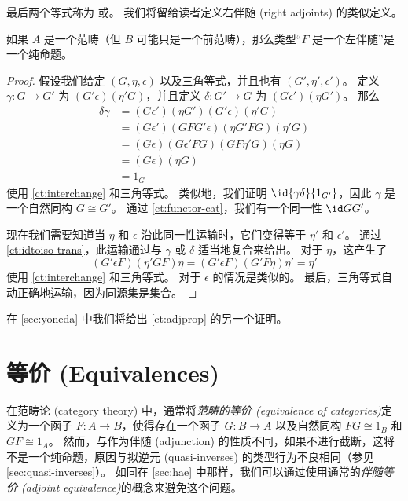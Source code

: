 最后两个等式称为 或。
我们将留给读者定义右伴随 (right adjoints) 的类似定义。

\begin{lem}\label{ct:adjprop}
如果 $A$ 是一个范畴（但 $B$ 可能只是一个前范畴），那么类型“$F$ 是一个左伴随”是一个纯命题。
\end{lem}
\begin{proof}
  假设我们给定 $(G,\eta,\epsilon)$ 以及三角等式，并且也有 $(G',\eta',\epsilon')$。
  定义 $\gamma:G\to G'$ 为 $(G'\epsilon)(\eta' G)$，并且定义 $\delta:G'\to G$ 为 $(G\epsilon')(\eta G')$。
  那么
  \begin{align*}
    \delta\gamma &=
    (G\epsilon')(\eta G')(G'\epsilon)(\eta'G)\\
    &= (G\epsilon')(G F G'\epsilon)(\eta G' F G)(\eta'G)\\
    &= (G\epsilon)(G\epsilon'FG)(G F \eta' G)(\eta G)\\
    &= (G\epsilon)(\eta G)\\
    &= 1_G
  \end{align*}
  使用 \cref{ct:interchange} 和三角等式。
  类似地，我们证明 $\id{\gamma\delta}{1_{G'}}$，因此 $\gamma$ 是一个自然同构 $G\cong G'$。
  通过 \cref{ct:functor-cat}，我们有一个同一性 $\id G {G'}$。

  现在我们需要知道当 $\eta$ 和 $\epsilon$ 沿此同一性运输时，它们变得等于 $\eta'$ 和 $\epsilon'$。
  通过 \cref{ct:idtoiso-trans}，此运输通过与 $\gamma$ 或 $\delta$ 适当地复合来给出。
  对于 $\eta$，这产生了
  \begin{equation*}
  (G'\epsilon F)(\eta'GF)\eta
  = (G'\epsilon F)(G'F\eta)\eta'
  = \eta'
  \end{equation*}
  使用 \cref{ct:interchange} 和三角等式。
  对于 $\epsilon$ 的情况是类似的。
  最后，三角等式自动正确地运输，因为同源集是集合。
\end{proof}

在 \cref{sec:yoneda} 中我们将给出 \cref{ct:adjprop} 的另一个证明。

\section{等价 (Equivalences)}
\label{sec:equivalences}

在范畴论 (category theory) 中，通常将\emph{范畴的等价 (equivalence of categories)}定义为一个函子 $F:A\to B$，使得存在一个函子 $G:B\to A$ 以及自然同构 $F G \cong 1_B$ 和 $G F \cong 1_A$。
然而，与作为伴随 (adjunction) 的性质不同，如果不进行截断，这将不是一个纯命题，原因与拟逆元 (quasi-inverses) 的类型行为不良相同（参见 \cref{sec:quasi-inverses}）。
如同在 \cref{sec:hae} 中那样，我们可以通过使用通常的\emph{伴随等价 (adjoint equivalence)}的概念来避免这个问题。

